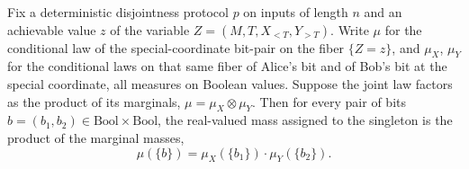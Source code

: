 \begin{theorem}
\label{CommunicationComplexity.Functions.Disjointness.RandomizedLowerBound.conditionalSpecialPairLaw_singleton_factorization_of_eq_prod}
\leanok
{}
Fix a deterministic disjointness protocol $p$ on inputs of length $n$ and an achievable
value $z$ of the variable $Z = (M, T, X_{<T}, Y_{>T})$. Write $\mu$ for the conditional
law of the special-coordinate bit-pair on the fiber $\{Z = z\}$, and $\mu_X$, $\mu_Y$
for the conditional laws on that same fiber of Alice's bit and of Bob's bit at the
special coordinate, all measures on Boolean values. Suppose the joint law factors as the
product of its marginals, $\mu = \mu_X \otimes \mu_Y$. Then for every pair of bits $b =
(b_1, b_2) \in \mathrm{Bool} \times \mathrm{Bool}$, the real-valued mass assigned to the
singleton is the product of the marginal masses, \[ \mu(\{b\}) = \mu_X(\{b_1\}) \cdot
\mu_Y(\{b_2\}). \]
\end{theorem}


